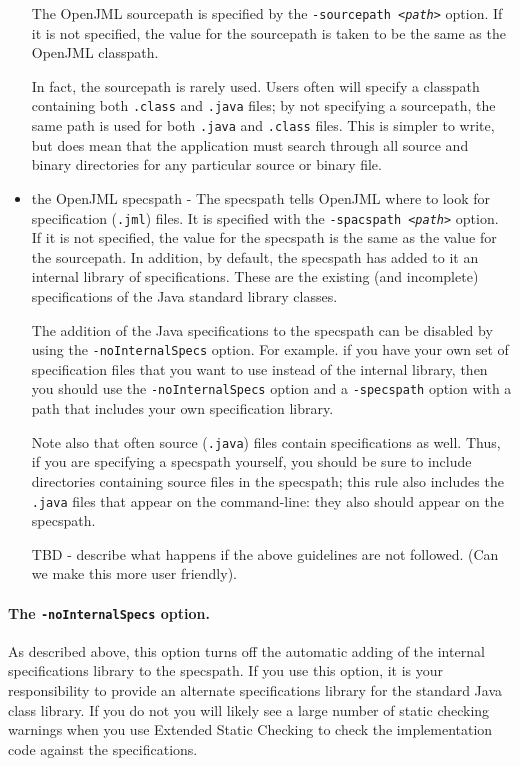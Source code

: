 \begin{itemize}
The OpenJML sourcepath is specified by the {\tt -sourcepath {\it <path>}} option. If it is not specified, the value for the sourcepath is taken to be the same as the OpenJML classpath.

In fact, the sourcepath is rarely used.  Users often will specify a classpath containing both {\tt .class} and {\tt .java} files; by 
not specifying a sourcepath, the same path is used for both {\tt .java} and {\tt .class} files. This is simpler to write, but does mean
that the application must search through all source and binary directories for any particular source or binary file.

\item the OpenJML specspath - The specspath tells OpenJML where to look for specification ({\tt .jml}) files. It is specified with the {\tt -spacspath {\it <path>}} option. If it is not specified, the value for the specspath is the same as the value for the sourcepath.  In addition, by default, the specspath
has added to it an internal library of specifications.  These are the existing (and incomplete) specifications of the Java standard library classes.

The addition of the Java specifications to the specspath can be disabled by using the {\tt -noInternalSpecs} option.  For example. if you
have your own set of specification files that you want to use instead of the internal library, then you should use the {\tt -noInternalSpecs} option and a {\tt -specspath} option with a path that includes your own specification library.

Note also that often source ({\tt .java}) files contain specifications as well. Thus, if you are specifying a specspath yourself, you should
be sure to include directories containing source files in the specspath; this rule also includes the {\tt .java} files that appear on the 
command-line: they also should appear on the specspath.

TBD - describe what happens if the above guidelines are not followed. (Can we make this more user friendly).

\end{itemize}

\paragraph{The {\tt -noInternalSpecs} option.} As described above, this option turns off the automatic adding of the internal specifications library to the specspath. If you use this option, it is your responsibility to provide an alternate specifications library for the standard
Java class library. If you do not you will likely see a large number of static checking warnings when you use Extended Static Checking to check the implementation code against the specifications.

